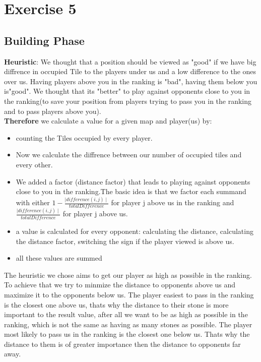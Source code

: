 \section{Exercise 5}
\subsection{Building Phase}
\textbf{Heuristic}:
We thought that a position should be viewed as "good" if we have big diffrence in occupied Tile to the players under us and a low difference to the ones over us. Having players above you in the ranking is "bad", having them below you is"good". We thought that its "better" to play against opponents close to you in the ranking(to save your position from players trying to pass you in the ranking and to pass players above you). \\
\textbf{Therefore} we calculate a value for a given map and player(us) by:
    \begin{itemize}
    \item counting the Tiles occupied by every player.
    \item Now we calculate the diffrence between our number of occupied tiles and every other.
    \item We added a factor (distance factor) that leads to playing against opponents close to you in the ranking.The basic idea is that we factor each summand with either $1 - \frac{\mid difference(i,j) \mid}{totalDifference}$ for player j above us in the ranking and  $\frac{\mid difference(i,j) \mid}{totalDifference}$ for player j above us.
    \item a value is calculated for every opponent: calculating the distance, calculating the distance factor, switching the sign if the player viewed is above us.
    \item all these values are summed
\end{itemize}
The heuristic we chose aims to get our player as high as possible in the ranking. To achieve that we try to minmize the distance to opponents above us and maximize it to the opponents below us. The player easiest to pass in the ranking is the closest one above us, thats why the distance to their stone is more important to the result value, after all we want to be as high as possible in the ranking, which is not the same as having as many stones as possible.  The player most likely to pass us in the ranking is the closest one below us. Thats why the distance to them is of greater importance then the distance to opponents far away.\newpage
